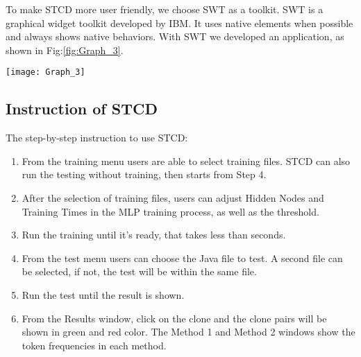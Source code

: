 \documentclass[../main.tex]{subfiles}
\begin{document}
To make STCD more user friendly, we choose SWT as a toolkit. SWT is a graphical widget toolkit developed by IBM. It uses native elements when possible and always shows native behaviors. With SWT we developed an application, as shown in Fig:\ref{fig:Graph_3}.

\begin{figure*}
\centering \texttt{[image: Graph\_3]} 
\caption{User Interface} \label{fig:Graph_3}
\end{figure*}

\subsection{Instruction of STCD}

The step-by-step instruction to use STCD:

\begin{enumerate}
\item From the training menu users are able to select training files. STCD can also run the testing without training, then starts from Step 4.
\item After the selection of training files, users can adjust Hidden Nodes and Training Times in the MLP training process, as well as the threshold. 
\item Run the training until it's ready, that takes less than seconds. 
\item From the test menu users can choose the Java file to test. A second file can be selected, if not, the test will be within the same file. 
\item Run the test until the result is shown.
\item From the Results window, click on the clone and the clone pairs will be shown in green and red color. The Method 1 and Method 2 windows show the token frequencies in each method.  
\end{enumerate}
\end{document}
